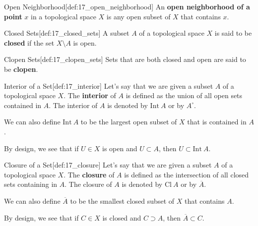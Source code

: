 \begin{defBox}{Open Neighborhood}[def:17_open_neighborhood]
    An \textbf{open neighborhood of a point} \( x \) in a topological space 
    \( X \) is any open subset of \( X \) that contains \( x \).
\end{defBox}

\begin{defBox}{Closed Sets}[def:17_closed_sets]
    A subset \( A \) of a topological space \( X \) is said to be 
    \textbf{closed} if the set \( X \setminus A \) is open.
\end{defBox}

\begin{defBox}{Clopen Sets}[def:17_clopen_sets]
    Sets that are both closed and open are said to be \textbf{clopen}.
\end{defBox}

\begin{defBox}{Interior of a Set}[def:17_interior]
    Let's say that we are given a subset \( A \) of a topological space 
    \( X \).
    The \textbf{interior} of \( A \) is defined as the union of all open sets 
    contained in \( A \).
    The interior of \( A \) is denoted by \( \mathrm{Int} \ A \) or by 
    \( A^{ \circ } \).

    \baseSkip

    We can also define \( \mathrm{Int} \ A \) to be the largest open subset of 
    \( X \) that is contained in \( A \).

    \baseSkip 

    By design, we see that if \( U \in X \) is open and \( U \subset A \), then 
    \( U \subset \mathrm{Int} \ A \).
\end{defBox}

\begin{defBox}{Closure of a Set}[def:17_closure]
    Let's say that we are given a subset \( A \) of a topological space 
    \( X \).
    The \textbf{closure} of \( A \) is defined as the intersection of all 
    closed sets containing in \( A \).
    The closure of \( A \) is denoted by \( \mathrm{Cl} \ A \) or by 
    \( \overline{ A } \).

    \baseSkip

    We can also define \( \overline{ A } \) to be the smallest closed subset of 
    \( X \) that contains \( A \).

    \baseSkip
    
    By design, we see that if \( C \in X \) is closed and \( C \supset A \), 
    then \( \overline{ A } \subset C \).
\end{defBox}

